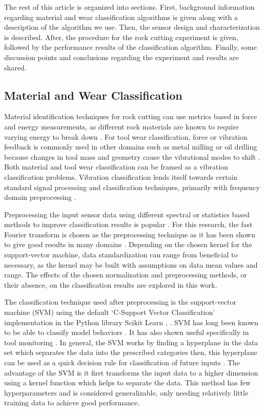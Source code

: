 The rest of this article is organized into sections. 
First, background information regarding material and wear classification algorithms is given along 
 with a description of the algorithm we use.
Then, the sensor design and characterization is described.
After, the procedure for the rock cutting experiment is given,
 followed by the performance results of the classification algorithm.
Finally, some discussion points and conclusions regarding the experiment and results are shared.


\subsection{Material and Wear Classification}
Material identification techniques for rock cutting can use metrics based in
 force and energy measurements, as different rock materials are known to require
 varying energy to break down \cite{teale65,klyuchnikov19}.
For tool wear classification, force or vibration feedback is commonly used in other domains such as 
 metal milling or oil drilling because changes in tool mass and geometry cause 
 the vibrational modes to shift \cite{klaic18, abu03, tao09, tao10}.
Both material and tool wear classification can be framed as a vibration classification problems.
Vibration classification lends itself towards certain standard
 signal processing and classification techniques,
 primarily with frequency domain preprocessing \cite{liu18}.

Preprocessing the input sensor data using different spectral or statistics
 based methods to improve classification results
 is popular \cite{peng11,tao09,qian10,tao10}.
For this research, the fast Fourier transform is chosen as the preprocessing technique
 as it has been shown to give good results in many domains \cite{ram09}.
Depending on the chosen kernel for the support-vector machine, data standardization
 can range from beneficial to necessary, as the kernel may be built with assumptions
 on data mean values and range.
The effects of the chosen normalization and preprocessing methods, 
 or their absence, on the classification results are explored in this work.

The classification technique used after preprocessing is the support-vector machine (SVM)
 using the default `C-Support Vector Classification' implementation in the Python library
Scikit Learn \cite{chang11}, \cite{platt99}.
SVM has long been known to be able to classify model behaviors \cite{mukh97}.
It has also shown useful specifically in tool  monitoring \cite{sun04}.
In general, the SVM works by finding a hyperplane in the data set
 which separates the data into the prescribed categories
 then, this hyperplane can be used as a quick decision rule
 for classification of future inputs \cite{chang11}.
The advantage of the SVM is it first transforms
 the input data to a higher dimension using a kernel function which helps to separate the data.
This method has few hyperparameters and is considered
 generalizable, only needing relatively little training data to achieve good performance.

